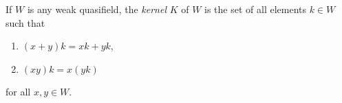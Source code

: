 If $W$ is any weak quasifield, the \emph{kernel} $K$ of $W$ is the set of all elements $k \in W$ such that
\begin{enumerate}
\item[(i)] $(x + y)k = xk + yk$,
\item[(ii)] $(xy)k = x(yk)$
\end{enumerate}
for all $x, y \in W$.
